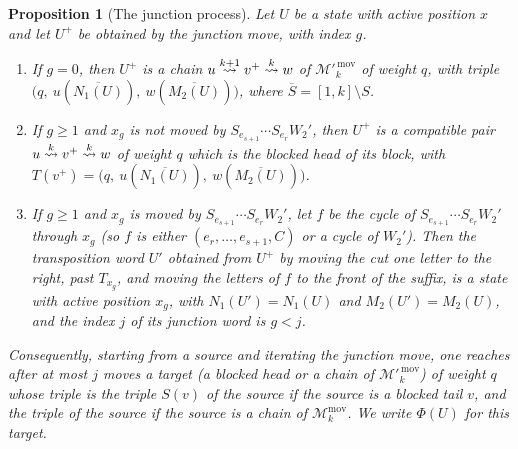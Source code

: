 \documentclass{amsart}
\newtheorem{proposition}[lemma]{Proposition}
\theoremstyle{definition}
\theoremstyle{remark}
\numberwithin{equation}{section}
\newcommand{\xrightsquigarrow}[2][]{%
	\mathrel{\mathop{\rightsquigarrow}\limits^{\scriptstyle #2}%
	\ifx\hfuzz#1\hfuzz\else_{\scriptstyle #1}\fi}%
}
\newcommand{\tom}[1]{\ensuremath{\xrightsquigarrow{#1}}}
\begin{document}
\begin{proposition}[The junction process] \label{prop:process}
Let $U$ be a state with active position $x$ and let $U^+$ be obtained by the junction move, with index $g$.
\begin{enumerate}
\item[(a)] If $g=0$, then $U^+$ is a chain $u\tom{k+1}v^+\tom{k}w$ of $\mathcal M'^{\,\mathrm{mov}}_k$ of weight $q$, with triple $\big(q,\ u(\overline{N_1(U)}),\ w(\overline{M_2(U)})\big)$, where $\overline S=[1,k]\setminus S$.
\item[(b)] If $g\geq1$ and $x_g$ is not moved by $S_{e_{s+1}}\cdots S_{e_r}W_2'$, then $U^+$ is a compatible pair $u\tom{k}v^+\tom{k}w$ of weight $q$ which is the blocked head of its block, with $T(v^+)=\big(q,\ u(\overline{N_1(U)}),\ w(\overline{M_2(U)})\big)$.
\item[(c)] If $g\geq1$ and $x_g$ is moved by $S_{e_{s+1}}\cdots S_{e_r}W_2'$, let $f$ be the cycle of $S_{e_{s+1}}\cdots S_{e_r}W_2'$ through $x_g$ (so $f$ is either $(e_r,\ldots,e_{s+1},C)$ or a cycle of $W_2'$). Then the transposition word $U'$ obtained from $U^+$ by moving the cut one letter to the right, past $T_{x_g}$, and moving the letters of $f$ to the front of the suffix, is a state with active position $x_g$, with $N_1(U')=N_1(U)$ and $M_2(U')=M_2(U)$, and the index $j$ of its junction word is $g<j$.
\end{enumerate}
Consequently, starting from a source and iterating the junction move, one reaches after at most $j$ moves a target (a blocked head or a chain of $\mathcal M'^{\,\mathrm{mov}}_k$) of weight $q$ whose triple is the triple $S(v)$ of the source if the source is a blocked tail $v$, and the triple of the source if the source is a chain of $\mathcal M_k^{\mathrm{mov}}$. We write $\Phi(U)$ for this target.
\end{proposition}
\end{document}
